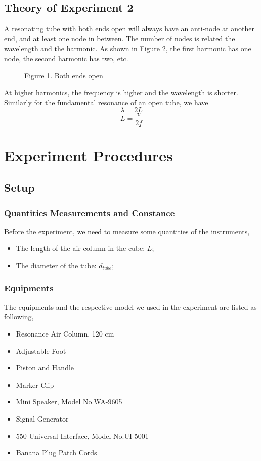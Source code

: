 \documentclass[12pt]{article}
\begin{document}
 	\subsection{Theory of Experiment 2}
 	A resonating tube with both ends open will always have an anti-node at another end, and at least one node in between. The number of nodes is related the wavelength and the harmonic. As shown in Figure 2, the first harmonic has one node, the second harmonic has two, etc.
 	\begin{figure}[H]
 		\centering
 		\caption{Figure 1. Both ends open}
 	\end{figure}
 	At higher harmonics, the frequency is higher and the wavelength is shorter. Similarly for the fundamental resonance of an open tube, we have
 	\begin{equation}
 		\lambda = 2L
 	\end{equation}
 	\begin{equation}
 		L = \frac{v}{2f}
 	\end{equation}
 	
 	\section{Experiment Procedures}
 	\subsection{Setup}
 	\subsubsection{Quantities Measurements and Constance}
 	Before the experiment, we need to measure some quantities of the instruments,
 	\begin{itemize}
 		\item The length of the air column in the cube: $ L $;
 		\item The diameter of the tube: $ d_{tube} $;
 	\end{itemize}
 	\subsubsection{Equipments}
 	The equipments and the respective model we used in the experiment are listed as following,
 	\begin{itemize}
 		\item Resonance Air Column, 120 cm
 		\item Adjustable Foot
 		\item Piston and Handle
 		\item Marker Clip
 		\item Mini Speaker, Model No.WA-9605
 		\item Signal Generator 
 		\item 550 Universal Interface, Model No.UI-5001
 		\item Banana Plug Patch Cords
 	\end{itemize}
\end{document}
